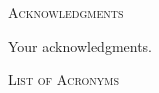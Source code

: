 \documentclass{UIdahoMastersThesis}
\begin{document}
\newpage


 \begin{center}
 	{\LARGE\textsc{Acknowledgments}}
 \end{center}
 
Your acknowledgments.

\newpage


   
   


\tableofcontents
\newpage




\listoffigures
\newpage




\begin{center}
	{\LARGE\textsc{List of Acronyms}}
\end{center}
\end{document}
